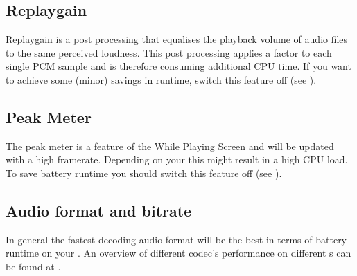


\subsection{Replaygain}
  Replaygain is a post processing that equalises the playback volume of audio
  files to the same perceived loudness. This post processing applies a factor
  to each single PCM sample and is therefore consuming additional CPU time. If
  you want to achieve some (minor) savings in runtime, switch this feature off
  (see ).

\subsection{Peak Meter}
  The peak meter is a feature of the While Playing Screen and will be updated with a
  high framerate. Depending on your \dap{} this might result in a high CPU load. To
  save battery runtime you should switch this feature off (see ).

\subsection{Audio format and bitrate}
  In general the fastest decoding audio format will be the best in terms of
  battery runtime on your \dap{}. An overview of different codec's performance
  on different \dap{}s can be found at .

